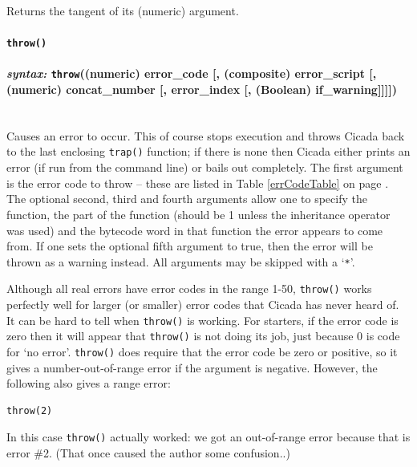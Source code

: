 \documentclass{article}
\newenvironment{code}{
       \begin{list}{}{
               \setlength{\leftmargin}{.4in}
               \setlength{\rightmargin}{0in}
               \setlength{\topsep}{.2in}
       }
       \small
       \item[] }
       { \end{list}   }
\begin{document}
Returns the tangent of its (numeric) argument.\\






\paragraph{\texttt{throw()}\\\\
\normalfont \emph{syntax: } \texttt{throw}((numeric) error\_code [, (composite) error\_script [, (numeric) concat\_number [, error\_index [, (Boolean) if\_warning]]]])\\\\}

Causes an error to occur.  This of course stops execution and throws Cicada back to the last enclosing \texttt{trap()} function; if there is none then Cicada either prints an error (if run from the command line) or bails out completely.  The first argument is the error code to throw -- these are listed in Table \ref{errCodeTable} on page \pageref{errCodeTable}.  The optional second, third and fourth arguments allow one to specify the function, the part of the function (should be 1 unless the inheritance operator was used) and the bytecode word in that function the error appears to come from.  If one sets the optional fifth argument to true, then the error will be thrown as a warning instead.  All arguments may be skipped with a `\verb#*#'.

Although all real errors have error codes in the range 1-50, \texttt{throw()} works perfectly well for larger (or smaller) error codes that Cicada has never heard of.  It can be hard to tell when \texttt{throw()} is working.  For starters, if the error code is zero then it will appear that \texttt{throw()} is not doing its job, just because 0 is code for `no error'.  \texttt{throw()} does require that the error code be zero or positive, so it gives a number-out-of-range error if the argument is negative.  However, the following also gives a range error:

\begin{code} \begin{verbatim}
throw(2)
\end{verbatim} \end{code}

\noindent In this case \texttt{throw()} actually worked:  we got an out-of-range error because that is error \#2.  (That once caused the author some confusion..)\\
\end{document}
